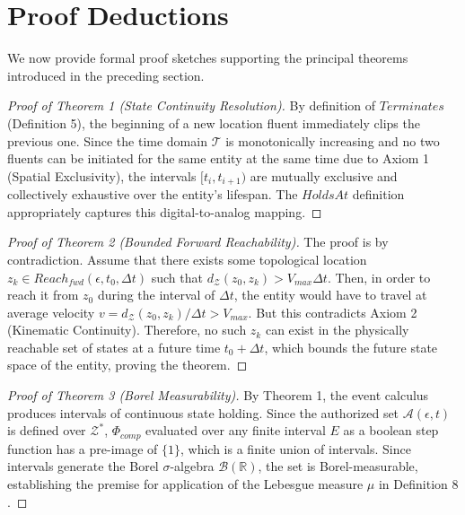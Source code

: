 \documentclass[conference]{IEEEtran}
\newcommand{\Z}{\mathcal{Z}} %
\newcommand{\T}{\mathcal{T}} %
\newcommand{\Auth}{\mathcal{A}} %
\begin{document}
\section{Proof Deductions}

We now provide formal proof sketches supporting the principal theorems introduced in the preceding section.

\begin{proof}[Proof of Theorem 1 (State Continuity Resolution)]
By definition of $Terminates$ (Definition 5), the beginning of a new location fluent immediately clips the previous one. Since the time domain $\T$ is monotonically increasing and no two fluents can be initiated for the same entity at the same time due to Axiom 1 (Spatial Exclusivity), the intervals $[t_i, t_{i+1})$ are mutually exclusive and collectively exhaustive over the entity’s lifespan. The $HoldsAt$ definition appropriately captures this digital-to-analog mapping.
\end{proof}

\begin{proof}[Proof of Theorem 2 (Bounded Forward Reachability)]
The proof is by contradiction. Assume that there exists some topological location $z_k \in Reach_{fwd}(\epsilon, t_0, \Delta t)$ such that $d_\Z(z_0, z_k) > V_{max} \Delta t$. Then, in order to reach it from $z_0$ during the interval of $\Delta t$, the entity would have to travel at average velocity $v = d_\Z(z_0, z_k) / \Delta t > V_{max}$. But this contradicts Axiom 2 (Kinematic Continuity). Therefore, no such $z_k$ can exist in the physically reachable set of states at a future time $t_0 + \Delta t$, which bounds the future state space of the entity, proving the theorem.
\end{proof}

\begin{proof}[Proof of Theorem 3 (Borel Measurability)]
By Theorem 1, the event calculus produces intervals of continuous state holding. Since the authorized set $\Auth(\epsilon, t)$ is defined over $\Z^*$, $\Phi_{comp}$ evaluated over any finite interval $E$ as a boolean step function has a pre-image of $\{1\}$, which is a finite union of intervals. Since intervals generate the Borel $\sigma$-algebra $\mathcal{B}(\mathbb{R})$, the set is Borel-measurable, establishing the premise for application of the Lebesgue measure $\mu$ in Definition 8 \cite{b20}.
\end{proof}
\end{document}

